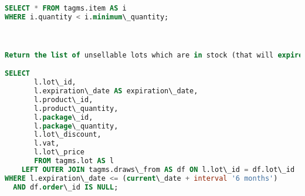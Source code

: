 \begin{lstlisting}[language=SQL,
keywordstyle=\color{blue},
stringstyle=\color{mauve},
showstringspaces=false,
basicstyle=\ttfamily\footnotesize]
SELECT * FROM tagms.item AS i
WHERE i.quantity < i.minimum\_quantity;



Return the list of unsellable lots which are in stock (that will expire in less than 6 months).

SELECT
       l.lot\_id,
       l.expiration\_date AS expiration\_date,
       l.product\_id,
       l.product\_quantity,
       l.package\_id,
       l.package\_quantity,
       l.lot\_discount,
       l.vat,
       l.lot\_price
       FROM tagms.lot AS l
    LEFT OUTER JOIN tagms.draws\_from AS df ON l.lot\_id = df.lot\_id
WHERE l.expiration\_date <= (current\_date + interval '6 months')
  AND df.order\_id IS NULL;

\end{lstlisting}

